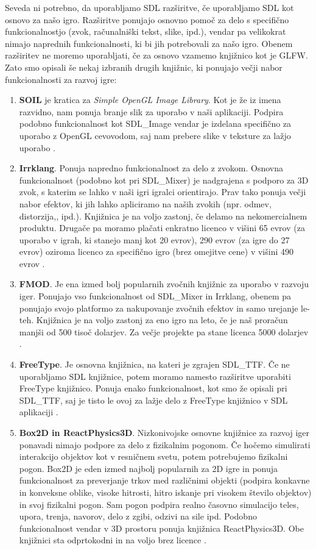 \documentclass[12pt,a4paper,twoside]{book}
\begin{document}
Seveda ni potrebno, da uporabljamo SDL razširitve, če uporabljamo SDL kot osnovo za našo igro. Razširitve ponujajo osnovno pomoč za delo s specifično funkcionalnostjo (zvok, računalniški tekst, slike, ipd.), vendar pa velikokrat nimajo naprednih funkcionalnosti, ki bi jih potrebovali za našo igro. Obenem razširitev ne moremo uporabljati, če za osnovo vzamemo knjižnico kot je GLFW. Zato smo opisali še nekaj izbranih drugih knjižnic, ki ponujajo večji nabor funkcionalnosti za razvoj igre:
\begin{enumerate}
	\item \textbf{SOIL} je kratica za \textit{Simple OpenGL Image Library}. Kot je že iz imena razvidno, nam ponuja branje slik za uporabo v naši aplikaciji. Podpira podobno funkcionalnost kot SDL\_Image vendar je izdelana specifično za uporabo z OpenGL cevovodom, saj nam prebere slike v teksture za lažjo uporabo \cite{soil}.
	\item \textbf{Irrklang}. Ponuja napredno funkcionalnost za delo z zvokom. Osnovna funkcionalnost (podobno kot pri SDL\_Mixer) je nadgrajena s podporo za 3D zvok, s katerim se lahko v naši igri igralci orientirajo. Prav tako ponuja večji nabor efektov, ki jih lahko apliciramo na naših zvokih (npr. odmev, distorzija,, ipd.). Knjižnica je na voljo zastonj, če delamo na nekomercialnem produktu. Drugače pa moramo plačati enkratno licenco v višini 65 evrov (za uporabo v igrah, ki stanejo manj kot 20 evrov), 290 evrov (za igre do 27 evrov) oziroma licenco za specifično igro (brez omejitve cene) v višini 490 evrov \cite{irrklang}. 
	\item \textbf{FMOD}. Je ena izmed bolj popularnih zvočnih knjižnic za uporabo v razvoju iger. Ponujajo vso funkcionalnost od SDL\_Mixer in Irrklang, obenem pa ponujajo svojo platformo za nakupovanje zvočnih efektov in samo urejanje le-teh. Knjižnica je na voljo zastonj za eno igro na leto, če je naš proračun manjši od 500 tisoč dolarjev. Za večje projekte pa stane licenca 5000 dolarjev \cite{fmod}.
	\item \textbf{FreeType}. Je osnovna knjižnica, na kateri je zgrajen SDL\_TTF. Če ne uporabljamo SDL knjižnice, potem moramo namesto razširitve uporabiti FreeType knjižnico. Ponuja enako funkcionalnost, kot smo že opisali pri SDL\_TTF, saj je tisto le ovoj za lažje delo z FreeType knjižnico v SDL aplikaciji \cite{freetype}.
	\item \textbf{Box2D in ReactPhysics3D}. Nizkonivojske osnovne knjižnice za razvoj iger ponavadi nimajo podpore za delo z fizikalnim pogonom. Če hočemo simulirati interakcijo objektov kot v resničnem svetu, potem potrebujemo fizikalni pogon. Box2D je eden izmed najbolj popularnih za 2D igre in ponuja funkcionalnost za preverjanje trkov med različnimi objekti (podpira konkavne in konveksne oblike, visoke hitrosti, hitro iskanje pri visokem število objektov) in svoj fizikalni pogon. Sam pogon podpira realno časovno simulacijo teles, upora, trenja, navorov, delo z zgibi, odzivi na sile ipd. Podobno funkcionalnost vendar v 3D prostoru ponuja knjižnica ReactPhysics3D. Obe knjižnici sta odprtokodni in na voljo brez licence \cite{box2d} \cite{reactPhysics3d}.
\end{enumerate}
\end{document}
